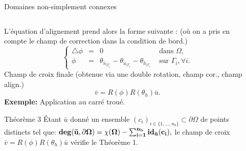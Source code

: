 \documentclass[compress,10pt,aspectratio=169]{beamer}
\begin{document}
\begin{frame}{Domaines non-simplement connexes}

\vspace{-0.3cm}
\small
\begin{columns}
\begin{column}{0.68\textwidth}
L'équation d'alignement prend alors la forme suivante : {\color{onera_gray} (où on a pris en compte le champ de correction dans la condition de bord.)}
\begin{equation*}
\left\{
\begin{array}{lcll}
    \triangle\phi& =& 0& \mbox{ dans }\Omega,\\[0.25cm]
    \phi &=& \theta_{\bar{n}_{|\Gamma_i}}-\theta_{\bar{u}_{|\Gamma_i}}-\theta_{h_{|\Gamma_i}}& \mbox{ sur }\Gamma_i, \forall i.
\end{array}
\right.
\end{equation*}
Champ de croix finale {\color{onera_gray} (obtenue via une double rotation, champ cor., champ align.)}
\begin{equation*}
\bar{v}=R(\phi)R(\theta_h)\bar{u}.
\end{equation*}
\textbf{Exemple:} Application au carré troué.\\\vspace{0.2cm}
\begin{onerablock}{
\small Théorème 3}
\'Etant $\bar{u}$ donné un ensemble $(c_i)_{i\in\{1,\dots,n_b\}}\subset\partial\Omega$ de points distincts tel que:
$
{\bf deg(\bar{u}, \partial\Omega) = \chi(\Omega)-\sum_{i=1}^{n_b} id_{\bar{u}}(c_i),}
$
le champ de croix $\bar{v}=R(\phi)R(\theta_h)\bar{u}$ vérifie le Théorème 1.
\end{onerablock}
\end{column}
\begin{column}{0.32\textwidth}
\centering

\end{column}
\end{columns}
\end{frame}
\end{document}
